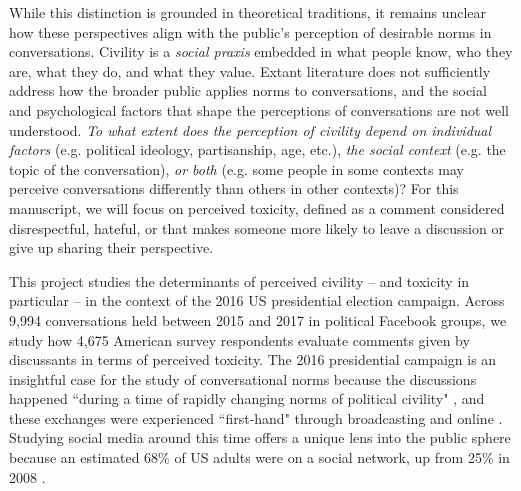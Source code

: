 \documentclass{article}
\begin{document}
While this distinction is grounded in theoretical traditions, it remains unclear how these perspectives align with the public's perception of desirable norms in conversations. Civility is a \textit{social praxis} embedded in what people know, who they are, what they do, and what they value. Extant literature does not sufficiently address how the broader public applies norms to conversations, and the social and psychological factors that shape the perceptions of conversations are not well understood. \textit{To what extent does the perception of civility depend on individual factors} (e.g. political ideology, partisanship, age, etc.), \textit{the social context} (e.g. the topic of the conversation), \textit{or both} (e.g. some people in some contexts may perceive conversations differently than others in other contexts)? For this manuscript, we will focus on perceived toxicity, defined as a comment considered disrespectful, hateful, or that makes someone more likely to leave a discussion or give up sharing their perspective. 

This project studies the determinants of perceived civility -- and toxicity in particular -- in the context of the 2016 US presidential election campaign. Across 9,994 conversations held between 2015 and 2017 in political Facebook groups, we study how 4,675 American survey respondents evaluate comments given by discussants in terms of perceived toxicity. The 2016 presidential campaign is an insightful case for the study of conversational norms because the discussions happened ``during a time of rapidly changing norms of political civility" \citep{munger_dont_2021}, and these exchanges were experienced ``first-hand" through broadcasting and online \citep{mutz_inyourface_2016}. Studying social media around this time offers a unique lens into the public sphere because an estimated 68\% of US adults were on a social network, up from 25\% in 2008 \citep{duggan_social_2016}.

\end{document}
